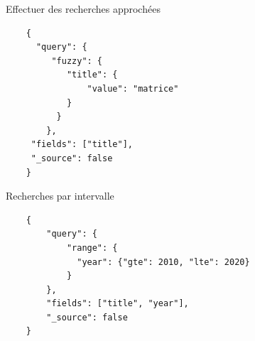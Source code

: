 \begin{frame}[fragile]{Effectuer des recherches approchées}

\begin{verbatim}
	{
	  "query": {
	     "fuzzy": {
      		"title": {
        		"value": "matrice"
    	  	}
    	  }
  		},
  	 "fields": ["title"],
	 "_source": false
	}
\end{verbatim}

\end{frame}


\begin{frame}[fragile]{Recherches par intervalle}

\begin{verbatim}
	{
  		"query": {
		    "range": {
		      "year": {"gte": 2010, "lte": 2020}
    		}
  		},
  		"fields": ["title", "year"],
  		"_source": false
	}
\end{verbatim}

\end{frame}






